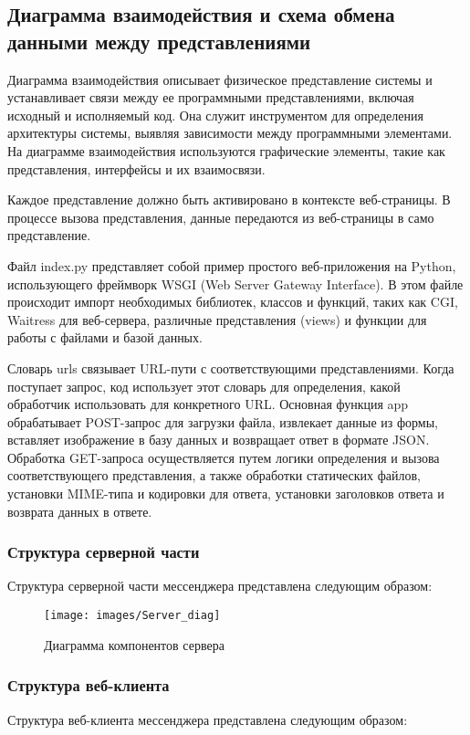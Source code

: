 \subsection{Диаграмма взаимодействия и схема обмена данными между представлениями}

Диаграмма взаимодействия описывает физическое представление системы и устанавливает связи между ее программными представлениями, включая исходный и исполняемый код. Она служит инструментом для определения архитектуры системы, выявляя зависимости между программными элементами. На диаграмме взаимодействия используются графические элементы, такие как представления, интерфейсы и их взаимосвязи.

Каждое представление должно быть активировано в контексте веб-страницы. В процессе вызова представления, данные передаются из веб-страницы в само представление.

Файл index.py представляет собой пример простого веб-приложения на Python, использующего фреймворк WSGI (Web Server Gateway Interface). В этом файле происходит импорт необходимых библиотек, классов и функций, таких как CGI, Waitress для веб-сервера, различные представления (views) и функции для работы с файлами и базой данных.



Словарь urls связывает URL-пути с соответствующими представлениями. Когда поступает запрос, код использует этот словарь для определения, какой обработчик использовать для конкретного URL. Основная функция app обрабатывает POST-запрос для загрузки файла, извлекает данные из формы, вставляет изображение в базу данных и возвращает ответ в формате JSON. Обработка GET-запроса осуществляется путем логики определения и вызова соответствующего представления, а также обработки статических файлов, установки MIME-типа и кодировки для ответа, установки заголовков ответа и возврата данных в ответе.


\subsubsection{Структура серверной части}
Структура серверной части мессенджера представлена следующим образом:

\begin{figure}[H]
	\centering
	\texttt{[image: images/Server\_diag]}
	\caption{Диаграмма компонентов сервера}
	\label{fig:serverdiag}
\end{figure}

\subsubsection{Структура веб-клиента}
Структура веб-клиента мессенджера представлена следующим образом:

